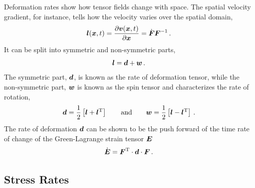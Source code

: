 \documentclass[10pt,letterpaper,oneside]{report}
\newcommand{\ten}[1]{\mbox{\boldmath $#1$}{}}
\newcommand{\scas}[1]{\mbox{{\scriptsize{${\rm{#1}}$}}}{}}
\begin{document}
\begin{itemize}
Deformation rates show how tensor fields change with space.  The spatial velocity gradient, for instance, tells how the velocity varies over the spatial domain, 
\begin{equation}
\ten{l} (\ten{x}, t) 
= \frac{\partial \ten{v} (\ten{x}, t) }{\partial\ten{x} } 
= \dot{\ten{F}} \ten{F}^{-1} \, . 
\end{equation}
It can be split into symmetric and non-symmetric parts, 
\begin{equation}
\ten{l} = \ten{d} + \ten{w} \, . 
\end{equation}
The symmetric part, $\ten{d}$, is known as the rate of deformation tensor, while the non-symmetric part, $\ten{w}$ is known as the spin tensor and characterizes the rate of rotation,
\begin{equation}
\ten{d} = \frac{1}{2} \left[ \ten{l} + \ten{l}^{\scas{T}} \right] 
\qquad \mbox{and} \qquad
\ten{w} = \frac{1}{2} \left[ \ten{l} - \ten{l}^{\scas{T}} \right] \, . 
\end{equation}
The rate of deformation $\ten{d}$ can be shown to be the push forward of the time rate of change of the Green-Lagrange strain tensor $\ten{E}$
\begin{equation}
\dot{\ten{E}} = \ten{F}^{\scas{T}} \cdot \ten{d} \cdot \ten{F} \, .
\end{equation}


\subsection{Stress Rates}


\end{itemize}
\end{document}
